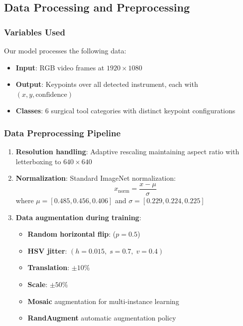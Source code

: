 \documentclass[11pt]{article}
\begin{document}
\subsection{Data Processing and Preprocessing}

\subsubsection{Variables Used}

Our model processes the following data:
\begin{itemize}[noitemsep]
    \item \textbf{Input}: RGB video frames at $1920 \times 1080$
    \item \textbf{Output}: Keypoints over all detected instrument, each with $(x, y, \text{confidence})$
    \item \textbf{Classes}: 6 surgical tool categories with distinct keypoint configurations
\end{itemize}

\subsubsection{Data Preprocessing Pipeline}

\begin{enumerate}[noitemsep]
    \item \textbf{Resolution handling}: Adaptive rescaling maintaining aspect ratio with letterboxing to $640 \times 640$
    \item \textbf{Normalization}: Standard ImageNet normalization:
    \begin{equation}
        x_{\text{norm}} = \frac{x - \mu}{\sigma}
    \end{equation}
    where $\mu = [0.485, 0.456, 0.406]$ and $\sigma = [0.229, 0.224, 0.225]$
    \item \textbf{Data augmentation during training}:
    \begin{itemize}[noitemsep]
        \item \textbf{Random horizontal flip}: ($p = 0.5$)
        \item \textbf{HSV jitter}: $(h=0.015,\; s=0.7,\; v=0.4)$
        \item \textbf{Translation}: $\pm 10\%$
        \item \textbf{Scale}: $\pm 50\%$
        \item \textbf{Mosaic} augmentation for multi-instance learning
        \item \textbf{RandAugment} automatic augmentation policy
    \end{itemize}
\end{enumerate}
\end{document}
